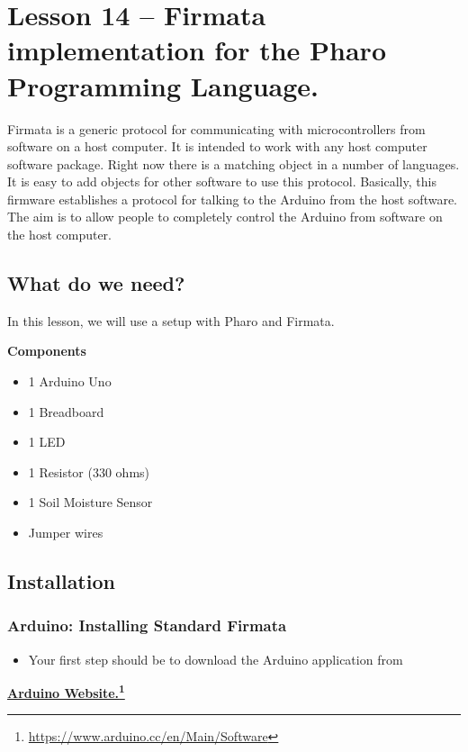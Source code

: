 \documentclass[10pt,twoside,english]{_support/latex/sbabook/sbabook}
\begin{document}
\frontmatter
\pagestyle{plain}

\tableofcontents*
\clearpage\listoffigures

\mainmatter

\chapter{Lesson 14 –  Firmata implementation for the Pharo Programming Language.}
Firmata is a generic protocol for communicating with microcontrollers from software on a host computer. 
It is intended to work with any host computer software package. Right now there is a matching object in a number of languages. 
It is easy to add objects for other software to use this protocol. 
Basically, this firmware establishes a protocol for talking to the Arduino from the host software. 
The aim is to allow people to completely control the Arduino from software on the host computer.
\section{What do we need?}
In this lesson, we will use a setup with Pharo and Firmata.

\textbf{Components}

\begin{itemize}
\item 1 Arduino Uno
\item 1 Breadboard
\item 1 LED
\item 1 Resistor (330 ohms)
\item 1 Soil Moisture Sensor
\item Jumper wires
\end{itemize}
\section{Installation}\subsection{Arduino: Installing Standard Firmata}
\begin{itemize}
\item Your first step should be to download the Arduino application from 
\end{itemize}

\textbf{\href{https://www.arduino.cc/en/Main/Software}{Arduino Website.}\footnote{\url{https://www.arduino.cc/en/Main/Software}}} 
\end{document}
